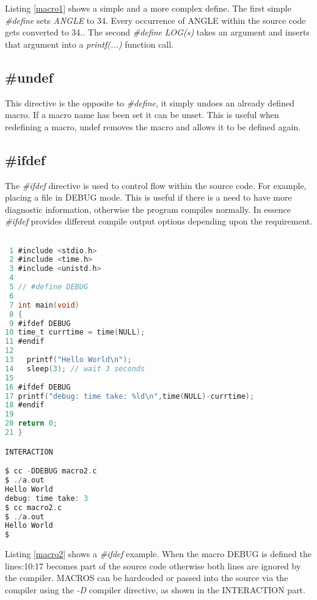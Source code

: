 Listing \ref{macro1} shows a simple and a more complex define. The first simple \textit{\#define} sets \textit{ANGLE} to 34. Every occurrence of ANGLE within the source code gets converted to 34.. The second \textit{\#define} \textit{LOG(s)} takes an argument and inserts that argument into a \textit{printf(...)} function call.

\subsection{\#undef}


This directive is the opposite to \textit{\#define}, it simply undoes an already defined macro. If a macro name has been set it can be unset. This is useful when redefining a macro, undef removes the macro and allows it to be defined again.

\subsection{\#ifdef}


The \textit{\#ifdef} directive is used to control flow within the source code. For example, placing a file in DEBUG mode. This is useful if there is a need to have more diagnostic information, otherwise the program compiles normally. In essence \textit{\#ifdef} provides different compile output options depending upon the requirement.

\begin{lstlisting}[language=C,showstringspaces=false, caption={File macro2.c, \#ifdef DEBUG macro},captionpos=b,label=macro2]

 1 #include <stdio.h>
 2 #include <time.h>
 3 #include <unistd.h>
 4 
 5 // #define DEBUG 
 6 
 7 int main(void)
 8 {
 9 #ifdef DEBUG
10 time_t currtime = time(NULL);
11 #endif
12 
13   printf("Hello World\n");
14   sleep(3); // wait 3 seconds
15 
16 #ifdef DEBUG
17 printf("debug: time take: %ld\n",time(NULL)-currtime);
18 #endif
19 
20 return 0;
21 }

INTERACTION

$ cc -DDEBUG macro2.c
$ ./a.out
Hello World
debug: time take: 3
$ cc macro2.c
$ ./a.out
Hello World
$

\end{lstlisting}


Listing \ref{macro2} shows a \textit{\#ifdef} example. When the macro DEBUG is defined the lines:10:17 becomes part of the source code otherwise both lines are ignored by the compiler. MACROS can be hardcoded or passed into the source via the compiler using the \textit{-D} compiler directive, as shown in the INTERACTION part. 

